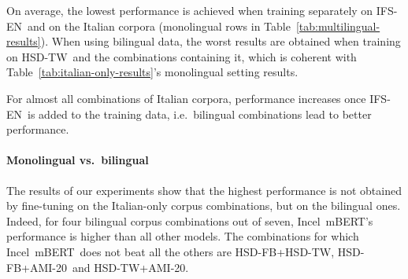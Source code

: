 \documentclass[11pt]{article}
\newcommand{\dsENclassification}{IFS-EN}
\newcommand{\dsITclassification}{IFS-IT}
\newcommand{\mbert}{\mbox{mBERT$_{base}$}}
\newcommand{\imbert}{\mbox{Incel mBERT}}
\newcommand{\hsdfb}{\mbox{HSD-FB}}
\newcommand{\hsdtw}{\mbox{HSD-TW}}
\newcommand{\ami}{\mbox{AMI-20}}
\begin{document}
On average, the lowest performance is achieved when training separately on \dsENclassification\, and on the Italian corpora (monolingual rows in Table~\ref{tab:multilingual-results}). When using bilingual data, the worst results are obtained when training on \hsdtw\, and the combinations containing it, which is coherent with \mbox{Table~\ref{tab:italian-only-results}'s} monolingual setting results.

For almost all combinations of Italian corpora, performance increases once \dsENclassification\, is added to the training data, i.e.\, bilingual combinations lead to better performance.


\paragraph{Monolingual vs.\ bilingual}
The results of our experiments show that the highest performance is not obtained by fine-tuning on the Italian-only corpus combinations, but on the bilingual ones. Indeed, for four bilingual corpus combinations out of seven, \imbert's performance is higher than all other models.
The combinations for which \imbert\, does not beat all the others are \hsdfb+\hsdtw, \hsdfb+\ami\, and \hsdtw+\ami.
\end{document}

